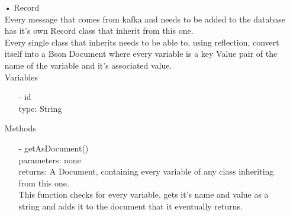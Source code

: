 \documentclass[oneside, english, final]{design}
\begin{document}
\begin{itemize}
	\item[•]Record
	      \\Every message that comes from kafka and needs to be added to the database has it's own Record class that inherit from this one.
	      \\Every single class that inherits needs to be able to, using reflection, convert itself into a Bson Document where every variable is a key Value pair of the name of the variable and it's associated value.
	      \\Variables
	      \begin{itemize}
		      \item[-] id
		            \\type: String
	      \end{itemize}
	      Methods
	      \begin{itemize}
		      \item[-]getAsDocument()
		            \\parameters: none
		            \\returns: A Document, containing every variable of any class inheriting from this one.
		            \\This function checks for every variable, gets it's name and value as a string and adds it to the document that it eventually returns.
	      \end{itemize}


\end{itemize}
\end{document}

